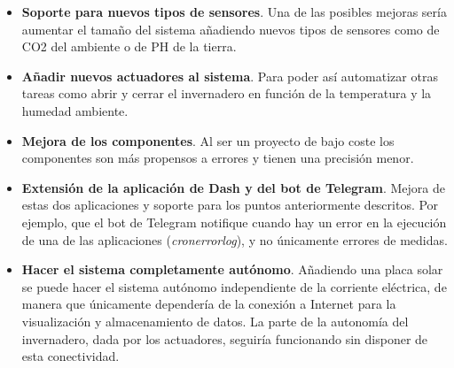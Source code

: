 \documentclass[a4paper, 12pt, oneside]{book}
\begin{document}
\begin{itemize}
\item \textbf{Soporte para nuevos tipos de sensores}. Una de las posibles mejoras sería aumentar el tamaño del sistema añadiendo nuevos tipos de sensores como de CO2 del ambiente o de PH de la tierra.

\item \textbf{Añadir nuevos actuadores al sistema}. Para poder así automatizar otras tareas como abrir y cerrar el invernadero en función de la temperatura y la humedad ambiente.

\item \textbf{Mejora de los componentes}. Al ser un proyecto de bajo coste los componentes son más propensos a errores y tienen una precisión menor.

\item \textbf{Extensión de la aplicación de Dash y del bot de Telegram}. Mejora de estas dos aplicaciones y soporte para los puntos anteriormente descritos. Por ejemplo, que el bot de Telegram notifique cuando hay un error en la ejecución de una de las aplicaciones (\textit{cronerrorlog}), y no únicamente errores de medidas.

\item \textbf{Hacer el sistema completamente autónomo}. Añadiendo una placa solar se puede hacer el sistema autónomo independiente de la corriente eléctrica, de manera que únicamente dependería de la conexión a Internet para la visualización y almacenamiento de datos. La parte de la autonomía del invernadero, dada por los actuadores, seguiría funcionando sin disponer de esta conectividad.
\end{itemize}


\cleardoublepage
\end{document}

